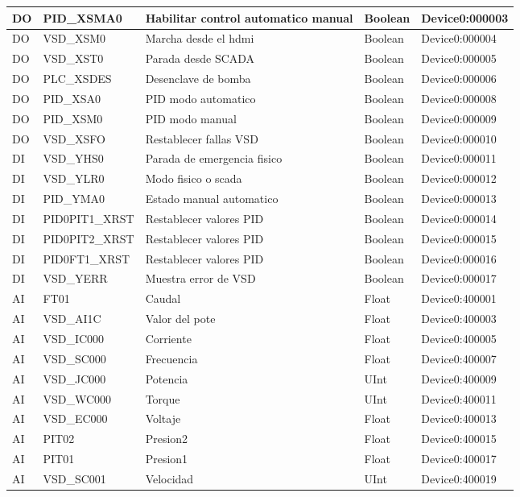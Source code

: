 \begin{longtable}{|p{1.2cm} |p{4cm} |p{4cm} |p{1.5cm} |p{3.2cm} |}
	DO & PID\_XSMA0 & Habilitar control automatico manual & Boolean & Device0:000003 \\ \hline
	DO & VSD\_XSM0 & Marcha desde el hdmi & Boolean & Device0:000004 \\ \hline
	DO & VSD\_XST0 & Parada desde SCADA & Boolean & Device0:000005 \\ \hline
	DO & PLC\_XSDES & Desenclave de bomba & Boolean & Device0:000006 \\ \hline
	DO & PID\_XSA0 & PID modo automatico & Boolean & Device0:000008 \\ \hline
	DO & PID\_XSM0 & PID modo manual & Boolean & Device0:000009 \\ \hline
	DO & VSD\_XSFO & Restablecer fallas VSD & Boolean & Device0:000010 \\ \hline
	DI & VSD\_YHS0 & Parada de emergencia fisico & Boolean & Device0:000011 \\ \hline
	DI & VSD\_YLR0 & Modo fisico o scada & Boolean & Device0:000012 \\ \hline
	DI & PID\_YMA0 & Estado manual automatico & Boolean & Device0:000013 \\ \hline
	DI & PID0PIT1\_XRST & Restablecer valores PID & Boolean & Device0:000014 \\ \hline
	DI & PID0PIT2\_XRST & Restablecer valores PID & Boolean & Device0:000015 \\ \hline
	DI & PID0FT1\_XRST & Restablecer valores PID& Boolean & Device0:000016 \\ \hline
	DI & VSD\_YERR & Muestra error de VSD& Boolean & Device0:000017 \\ \hline
	AI & FT01 & Caudal & Float & Device0:400001 \\ \hline
	AI & VSD\_AI1C & Valor del pote & Float & Device0:400003 \\ \hline
	AI & VSD\_IC000 & Corriente & Float & Device0:400005 \\ \hline
	AI & VSD\_SC000 & Frecuencia & Float & Device0:400007 \\ \hline
	AI & VSD\_JC000 & Potencia & UInt & Device0:400009 \\ \hline
	AI & VSD\_WC000 & Torque & UInt & Device0:400011 \\ \hline
	AI & VSD\_EC000 & Voltaje & Float & Device0:400013 \\ \hline
	AI & PIT02 & Presion2 & Float & Device0:400015 \\ \hline
	AI & PIT01 & Presion1 & Float & Device0:400017 \\ \hline
	AI & VSD\_SC001 & Velocidad & UInt & Device0:400019 \\ \hline

\end{longtable}
